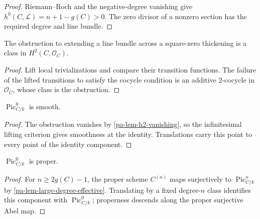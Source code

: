 \begin{proof}
  Riemann--Roch and the negative-degree vanishing give
  \(h^0(C,\mathcal L)=n+1-g(C)>0\).  The zero divisor of a nonzero section
  has the required degree and line bundle.
\end{proof}

\begin{lemma}
  \label{pa-lem-picard-obstruction}
  \cite{kleiman-picard}
  The obstruction to extending a line bundle across a square-zero thickening
  is a class in \(H^2(C,\mathcal O_C)\).
\end{lemma}

\begin{proof}
  Lift local trivializations and compare their transition functions.  The
  failure of the lifted transitions to satisfy the cocycle condition is an
  additive \(2\)-cocycle in \(\mathcal O_C\), whose class is the obstruction.
\end{proof}

\begin{proposition}
  \label{pa-prop-pic0-smooth}
  \cite{kleiman-picard}
  \(\operatorname{Pic}^0_{C/k}\) is smooth.
\end{proposition}

\begin{proof}
  The obstruction vanishes by \ref{pa-lem-h2-vanishing}, so the infinitesimal
  lifting criterion gives smoothness at the identity.  Translations carry this
  point to every point of the identity component.
\end{proof}

\begin{proposition}
  \label{pa-prop-pic0-proper}
  \cite{kleiman-picard}
  \(\operatorname{Pic}^0_{C/k}\) is proper.
\end{proposition}

\begin{proof}
  For \(n\ge2g(C)-1\), the proper scheme \(C^{(n)}\) maps surjectively to
  \(\operatorname{Pic}^n_{C/k}\) by
  \ref{pa-lem-large-degree-effective}.  Translating by a fixed degree-\(n\)
  class identifies this component with \(\operatorname{Pic}^0_{C/k}\);
  properness descends along the proper surjective Abel map.
\end{proof}


